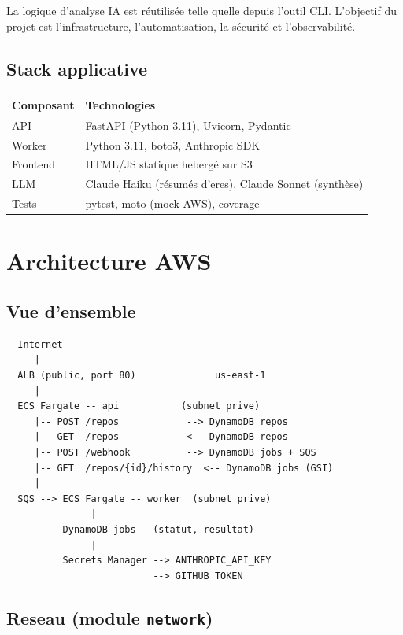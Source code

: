 \documentclass[11pt,a4paper]{article}
\newcommand{\code}[1]{\texttt{#1}}
\begin{document}
La logique d'analyse IA est r\'{e}utilis\'{e}e telle quelle depuis l'outil CLI. L'objectif du projet est l'infrastructure, l'automatisation, la s\'{e}curit\'{e} et l'observabilit\'{e}.

\subsection{Stack applicative}

\begin{tabularx}{\linewidth}{lX}
\toprule
Composant & Technologies \\
\midrule
API & FastAPI (Python 3.11), Uvicorn, Pydantic \\
Worker & Python 3.11, boto3, Anthropic SDK \\
Frontend & HTML/JS statique heberg\'{e} sur S3 \\
LLM & Claude Haiku (r\'{e}sum\'{e}s d'eres), Claude Sonnet (synth\`{e}se) \\
Tests & pytest, moto (mock AWS), coverage \\
\bottomrule
\end{tabularx}

\section{Architecture AWS}

\subsection{Vue d'ensemble}

\begin{verbatim}
  Internet
     |
  ALB (public, port 80)              us-east-1
     |
  ECS Fargate -- api           (subnet prive)
     |-- POST /repos            --> DynamoDB repos
     |-- GET  /repos            <-- DynamoDB repos
     |-- POST /webhook          --> DynamoDB jobs + SQS
     |-- GET  /repos/{id}/history  <-- DynamoDB jobs (GSI)
     |
  SQS --> ECS Fargate -- worker  (subnet prive)
               |
          DynamoDB jobs   (statut, resultat)
               |
          Secrets Manager --> ANTHROPIC_API_KEY
                          --> GITHUB_TOKEN
\end{verbatim}

\subsection{Reseau (module \code{network})}
\end{document}
